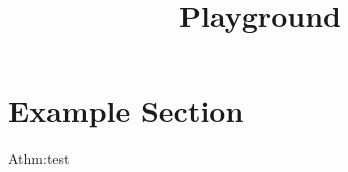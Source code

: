 \documentclass{article}
\title{Playground}
\begin{document}
\maketitle
\tableofcontents

\section{Example Section}
\lipsum[1]

\begin{TheoremC}{A}{thm:test}
  \lipsum[2]
\end{TheoremC}

\end{document}
